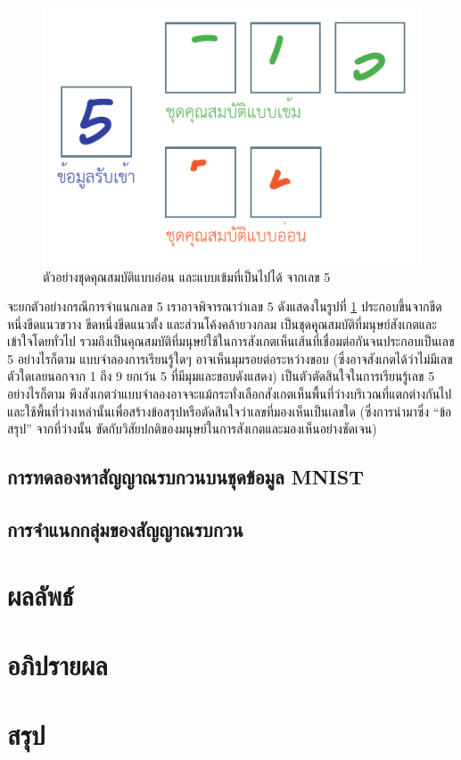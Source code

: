 \documentclass{cpepaper}
\begin{document}
\begin{figure}
    \centering
    \includegraphics[width=\columnwidth]{images/strong-weak-features.pdf}
    \caption{ตัวอย่างชุดคุณสมบัติแบบอ่อน และแบบเข้มที่เป็นไปได้ จากเลข 5}
    \label{5-weak-strong}
\end{figure}

จะยกตัวอย่างกรณีการจำแนกเลข 5 เราอาจพิจารณาว่าเลข 5 ดังแสดงในรูปที่ \ref{5-weak-strong} ประกอบขึ้นจากขีดหนึ่งขีดแนวขวาง ขีดหนึ่งขีดแนวตั้ง และส่วนโค้งคล้ายวงกลม เป็นชุดคุุณสมบัติที่มนุษย์สังเกตและเข้าใจโดยทั่วไป รวมถึงเป็นคุณสมบัติที่มนุษย์ใช้ในการสังเกตเห็นเส้นที่เชื่อมต่อกันจนประกอบเป็นเลข 5 อย่างไรก็ตาม แบบจำลองการเรียนรู้ใดๆ อาจเห็นมุมรอยต่อระหว่างขอบ (ซึ่งอาจสังเกตได้ว่าไม่มีเลขตัวใดเลยนอกจาก 1 ถึง 9 ยกเว้น 5 ที่มีมุมและขอบดังแสดง) เป็นตัวตัดสินใจในการเรียนรู้เลข 5 อย่างไรก็ตาม พึงสังเกตว่าแบบจำลองอาจจะแม้กระทั่งเลือกสังเกตเห็นพื้นที่ว่างบริเวณที่แตกต่างกันไป และใช้พื้นที่ว่างเหล่านั้นเพื่อสร้างข้อสรุปหรือตัดสินใจว่าเลขที่มองเห็นเป็นเลขใด (ซึ่งการนำมาซึ่ง ``ข้อสรุป'' จากที่ว่างนั้น ขัดกับวิสัยปกติของมนุษย์ในการสังเกตและมองเห็นอย่างชัดเจน)

\subsection{การทดลองหาสัญญาณรบกวนบนชุดข้อมูล MNIST}

\subsection{การจำแนกกลุ่มของสัญญาณรบกวน}

\section{ผลลัพธ์}

\section{อภิปรายผล}

\section{สรุป}
\end{document}
